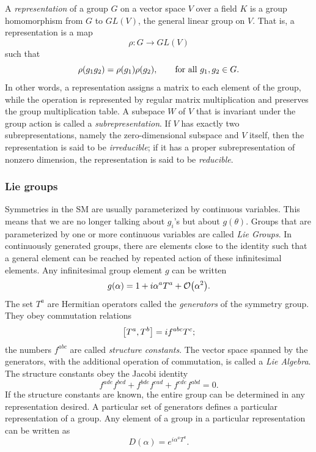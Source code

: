 A \emph{representation} of a group $G$ on a vector space $V$ over a field $K$ is a group homomorphism from $G$ to $GL(V)$, the general linear group on $V$. That is, a representation is a map
\begin{equation}
\rho:G\rightarrow GL(V)
\end{equation}
such that
\begin{equation}
\rho\qty(g_1 g_2)=\rho\qty(g_1)\rho\qty(g_2),\qquad \textrm{for all}\,\, g_1,g_2\in G.
\end{equation}
In other words, a representation assigns a matrix to each element of the group, while the operation is represented by regular matrix multiplication and preserves the group multiplication table. A subspace $W$ of $V$ that is invariant under the group action is called a \emph{subrepresentation}. If $V$ has exactly two subrepresentations, namely the zero-dimensional subspace and $V$ itself, then the representation is said to be \emph{irreducible}; if it has a proper subrepresentation of nonzero dimension, the representation is said to be \emph{reducible}. 

\subsubsection{Lie groups}

Symmetries in the SM are usually parameterized by continuous variables. This means that we are no longer talking about $g_i$'s but about $g(\theta)$. Groups that are parameterized by one or more continuous variables are called \emph{Lie Groups}. In continuously generated groups, there are elements close to the identity such that a general element can be reached by repeated action of these infinitesimal elements. Any infinitesimal group element $g$ can be written
\begin{equation}
g\qty(\alpha)=1+i\alpha^aT^a+\order{\alpha^2}.
\end{equation}
The set $T^a$ are Hermitian operators called the \emph{generators} of the symmetry group. They obey commutation relations
\begin{equation}
\comm{T^a}{T^b}=i f^{abc}T^c;
\end{equation}
the numbers $f^{abc}$ are called \emph{structure constants}. The vector space spanned by the generators, with the additional operation of commutation, is called a \emph{Lie Algebra}. The structure constants obey the Jacobi identity
\begin{equation}
f^{ade}f^{bcd}+f^{bde}f^{cad}+f^{cde}f^{abd}=0.
\end{equation}
If the structure constants are known, the entire group can be determined in any representation desired. A particular set of generators defines a particular representation of a group. Any element of a group in a particular representation can be written as
\begin{equation}
D(\alpha)=e^{i\alpha^{a}T^{a}}.
\end{equation}

